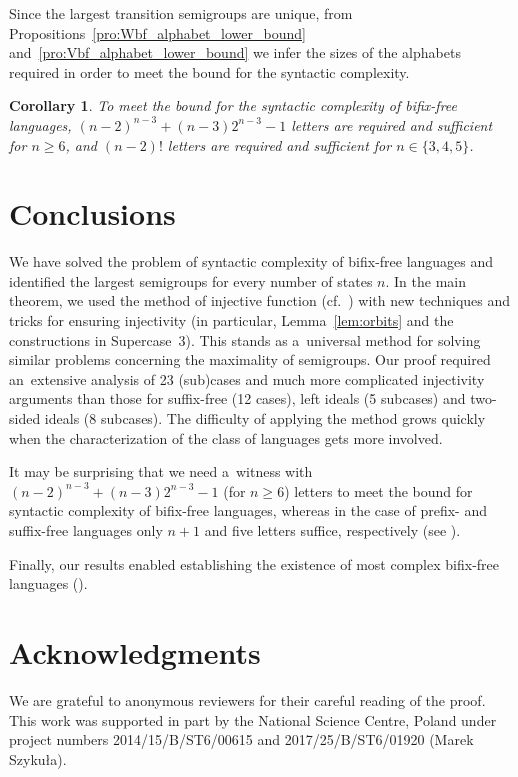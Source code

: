 \documentclass{amsart}
\newtheorem{corollary}[theorem]{Corollary}
\renewcommand{\ge}{\geqslant}
\begin{document}
Since the largest transition semigroups are unique, from Propositions~\ref{pro:Wbf_alphabet_lower_bound} and~\ref{pro:Vbf_alphabet_lower_bound} we infer the sizes of the alphabets required in order to meet the bound for the syntactic complexity.
\begin{corollary}
To meet the bound for the syntactic complexity of bifix-free languages, $(n-2)^{n-3} + (n-3)2^{n-3} - 1$ letters are required and sufficient for $n \ge 6$, and $(n-2)!$ letters are required and sufficient for $n \in \{3,4,5\}$.
\end{corollary}



\section{Conclusions}

We have solved the problem of syntactic complexity of bifix-free languages and identified the largest semigroups for every number of states $n$.
In the main theorem, we used the method of injective function (cf.~\cite{BrSz14a,BrSz15SyntacticComplexityOfSuffixFree}) with new techniques and tricks for ensuring injectivity (in particular, Lemma~\ref{lem:orbits} and the constructions in Supercase~3). This stands as a~universal method for solving similar problems concerning the maximality of semigroups.
Our proof required an~extensive analysis of 23 (sub)cases and much more complicated injectivity arguments than those for suffix-free (12 cases), left ideals (5 subcases) and two-sided ideals (8 subcases).
The difficulty of applying the method grows quickly when the characterization of the class of languages gets more involved.

It may be surprising that we need a~witness with $(n-2)^{n-3} + (n-3)2^{n-3} - 1$ (for $n \ge 6$) letters to meet the bound for syntactic complexity of bifix-free languages, whereas in the case of prefix- and suffix-free languages only $n+1$ and five letters suffice, respectively (see \cite{BLY12,BrSz15SyntacticComplexityOfSuffixFree}).

Finally, our results enabled establishing the existence of most complex bifix-free languages (\cite{FeSz17ComplexityOfBifixFree,FeSz18ComplexityOfBifixFree}).

\section*{Acknowledgments}

We are grateful to anonymous reviewers for their careful reading of the proof.
This work was supported in part by the National Science Centre, Poland under project numbers 2014/15/B/ST6/00615 and 2017/25/B/ST6/01920 (Marek Szyku{\l}a).
\end{document}
